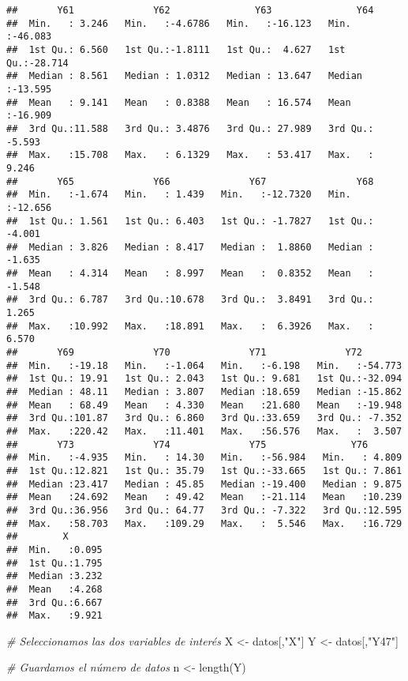 \documentclass[
]{article}
\newenvironment{Shaded}{\begin{snugshade}}{\end{snugshade}}
\newcommand{\CommentTok}[1]{\textcolor[rgb]{0.56,0.35,0.01}{\textit{#1}}}
\newcommand{\FunctionTok}[1]{\textcolor[rgb]{0.00,0.00,0.00}{#1}}
\newcommand{\NormalTok}[1]{#1}
\newcommand{\OtherTok}[1]{\textcolor[rgb]{0.56,0.35,0.01}{#1}}
\newcommand{\StringTok}[1]{\textcolor[rgb]{0.31,0.60,0.02}{#1}}
\begin{document}
\begin{verbatim}
##       Y61              Y62               Y63               Y64         
##  Min.   : 3.246   Min.   :-4.6786   Min.   :-16.123   Min.   :-46.083  
##  1st Qu.: 6.560   1st Qu.:-1.8111   1st Qu.:  4.627   1st Qu.:-28.714  
##  Median : 8.561   Median : 1.0312   Median : 13.647   Median :-13.595  
##  Mean   : 9.141   Mean   : 0.8388   Mean   : 16.574   Mean   :-16.909  
##  3rd Qu.:11.588   3rd Qu.: 3.4876   3rd Qu.: 27.989   3rd Qu.: -5.593  
##  Max.   :15.708   Max.   : 6.1329   Max.   : 53.417   Max.   :  9.246  
##       Y65              Y66              Y67                Y68         
##  Min.   :-1.674   Min.   : 1.439   Min.   :-12.7320   Min.   :-12.656  
##  1st Qu.: 1.561   1st Qu.: 6.403   1st Qu.: -1.7827   1st Qu.: -4.001  
##  Median : 3.826   Median : 8.417   Median :  1.8860   Median : -1.635  
##  Mean   : 4.314   Mean   : 8.997   Mean   :  0.8352   Mean   : -1.548  
##  3rd Qu.: 6.787   3rd Qu.:10.678   3rd Qu.:  3.8491   3rd Qu.:  1.265  
##  Max.   :10.992   Max.   :18.891   Max.   :  6.3926   Max.   :  6.570  
##       Y69              Y70              Y71              Y72         
##  Min.   :-19.18   Min.   :-1.064   Min.   :-6.198   Min.   :-54.773  
##  1st Qu.: 19.91   1st Qu.: 2.043   1st Qu.: 9.681   1st Qu.:-32.094  
##  Median : 48.11   Median : 3.807   Median :18.659   Median :-15.862  
##  Mean   : 68.49   Mean   : 4.330   Mean   :21.680   Mean   :-19.948  
##  3rd Qu.:101.87   3rd Qu.: 6.860   3rd Qu.:33.659   3rd Qu.: -7.352  
##  Max.   :220.42   Max.   :11.401   Max.   :56.576   Max.   :  3.507  
##       Y73              Y74              Y75               Y76        
##  Min.   :-4.935   Min.   : 14.30   Min.   :-56.984   Min.   : 4.809  
##  1st Qu.:12.821   1st Qu.: 35.79   1st Qu.:-33.665   1st Qu.: 7.861  
##  Median :23.417   Median : 45.85   Median :-19.400   Median : 9.875  
##  Mean   :24.692   Mean   : 49.42   Mean   :-21.114   Mean   :10.239  
##  3rd Qu.:36.956   3rd Qu.: 64.77   3rd Qu.: -7.322   3rd Qu.:12.595  
##  Max.   :58.703   Max.   :109.29   Max.   :  5.546   Max.   :16.729  
##        X        
##  Min.   :0.095  
##  1st Qu.:1.795  
##  Median :3.232  
##  Mean   :4.268  
##  3rd Qu.:6.667  
##  Max.   :9.921
\end{verbatim}

\begin{Shaded}
\begin{Highlighting}[]
\CommentTok{\# Seleccionamos las dos variables de interés}
\NormalTok{X }\OtherTok{\textless{}{-}}\NormalTok{ datos[,}\StringTok{"X"}\NormalTok{]}
\NormalTok{Y }\OtherTok{\textless{}{-}}\NormalTok{ datos[,}\StringTok{"Y47"}\NormalTok{]}

\CommentTok{\# Guardamos el número de datos}
\NormalTok{n }\OtherTok{\textless{}{-}} \FunctionTok{length}\NormalTok{(Y)}
\end{Highlighting}
\end{Shaded}
\end{document}
